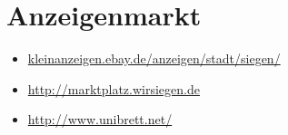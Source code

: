 \section{Anzeigenmarkt}
\begin{itemize}
	\item \href{http://kleinanzeigen.ebay.de/anzeigen/stadt/siegen/}{kleinanzeigen.ebay.de/anzeigen/stadt/siegen/}
	\item \href{http://marktplatz.wirsiegen.de/}{http://marktplatz.wirsiegen.de} 
	\item \href{http://www.unibrett.net/}{http://www.unibrett.net/}
\end{itemize}
